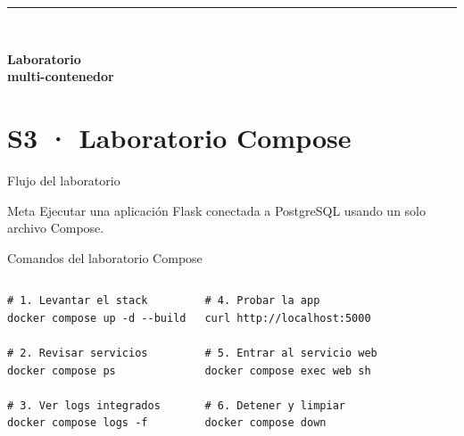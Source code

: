 \documentclass[aspectratio=169]{beamer}
\newcommand{\MainHeaderSlide}[2]{%
  \begingroup
  \setbeamercolor{background canvas}{bg=white}
  \begin{frame}[plain]
    \vfill
    \hspace*{0.9cm}%
    \begin{minipage}{0.78\paperwidth}
      {\color{UUblack}\rule{4cm}{1.3pt}}\\[14pt]
      {\raggedright\color{UUblack}\fontsize{36}{42}\selectfont\rmfamily\bfseries #1\par}
    \end{minipage}
    \vfill
  \end{frame}
  \endgroup
}
\begin{document}
\MainHeaderSlide{Laboratorio\\multi-contenedor}{Levantar Flask y PostgreSQL con Compose}
\section{S3 · Laboratorio Compose}

\begin{frame}{Flujo del laboratorio}
  \begin{center}
  \end{center}
  \begin{block}{Meta}
    Ejecutar una aplicación Flask conectada a PostgreSQL usando un solo archivo Compose.
  \end{block}
\end{frame}

\begin{frame}[fragile]{Comandos del laboratorio Compose}
  \footnotesize
  \begin{columns}[T]
\begin{lstlisting}[style=terminal]
# 1. Levantar el stack
docker compose up -d --build

# 2. Revisar servicios
docker compose ps

# 3. Ver logs integrados
docker compose logs -f
\end{lstlisting}
\begin{lstlisting}[style=terminal]
# 4. Probar la app
curl http://localhost:5000

# 5. Entrar al servicio web
docker compose exec web sh

# 6. Detener y limpiar
docker compose down
\end{lstlisting}
  \end{columns}
\end{frame}
\end{document}
